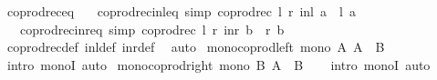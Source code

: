 \begin{isabellebody}
\isanewline
{}\isamarkupfalse%
\ coprod{\isacharunderscore}{\kern0pt}rec{\isacharunderscore}{\kern0pt}eq{\isacharcolon}{\kern0pt}\isanewline
\ \ \ coprod{\isacharunderscore}{\kern0pt}rec{\isacharunderscore}{\kern0pt}inl{\isacharunderscore}{\kern0pt}eq\ {\isacharbrackleft}{\kern0pt}simp{\isacharbrackright}{\kern0pt}{\isacharcolon}{\kern0pt}\ {\isachardoublequoteopen}coprod{\isacharunderscore}{\kern0pt}rec\ l\ r\ {\isacharparenleft}{\kern0pt}inl\ a{\isacharparenright}{\kern0pt}\ {\isacharequal}{\kern0pt}\ l\ a{\isachardoublequoteclose}\isanewline
\ \ \ coprod{\isacharunderscore}{\kern0pt}rec{\isacharunderscore}{\kern0pt}inr{\isacharunderscore}{\kern0pt}eq\ {\isacharbrackleft}{\kern0pt}simp{\isacharbrackright}{\kern0pt}{\isacharcolon}{\kern0pt}\ {\isachardoublequoteopen}coprod{\isacharunderscore}{\kern0pt}rec\ l\ r\ {\isacharparenleft}{\kern0pt}inr\ b{\isacharparenright}{\kern0pt}\ {\isacharequal}{\kern0pt}\ r\ b{\isachardoublequoteclose}\isanewline
%
\isadelimproof
\ \ %
\endisadelimproof
%
\isatagproof
{}\isamarkupfalse%
\ coprod{\isacharunderscore}{\kern0pt}rec{\isacharunderscore}{\kern0pt}def\ inl{\isacharunderscore}{\kern0pt}def\ inr{\isacharunderscore}{\kern0pt}def\ \isamarkupfalse%
\ auto%
\endisatagproof
{\isafoldproof}%
%
\isadelimproof
\isanewline
%
\endisadelimproof
\isanewline
\isanewline
{}\isamarkupfalse%
\ mono{\isacharunderscore}{\kern0pt}coprod{\isacharunderscore}{\kern0pt}left{\isacharcolon}{\kern0pt}\ {\isachardoublequoteopen}mono\ {\isacharparenleft}{\kern0pt}{\isasymlambda}A{\isachardot}{\kern0pt}\ A\ {\isasymCoprod}\ B{\isacharparenright}{\kern0pt}{\isachardoublequoteclose}\isanewline
%
\isadelimproof
\ \ %
\endisadelimproof
%
\isatagproof
{}\isamarkupfalse%
\ {\isacharparenleft}{\kern0pt}intro\ monoI{\isacharparenright}{\kern0pt}\ auto%
\endisatagproof
{\isafoldproof}%
%
\isadelimproof
\isanewline
%
\endisadelimproof
\isanewline
{}\isamarkupfalse%
\ mono{\isacharunderscore}{\kern0pt}coprod{\isacharunderscore}{\kern0pt}right{\isacharcolon}{\kern0pt}\ {\isachardoublequoteopen}mono\ {\isacharparenleft}{\kern0pt}{\isasymlambda}B{\isachardot}{\kern0pt}\ A\ {\isasymCoprod}\ B{\isacharparenright}{\kern0pt}{\isachardoublequoteclose}\isanewline
%
\isadelimproof
\ \ %
\endisadelimproof
%
\isatagproof
{}\isamarkupfalse%
\ {\isacharparenleft}{\kern0pt}intro\ monoI{\isacharparenright}{\kern0pt}\ auto%
\endisatagproof
{\isafoldproof}%
%
\isadelimproof
\isanewline
%
\endisadelimproof
\isanewline
%
\isadelimtheory
\isanewline
%
\endisadelimtheory
%
\isatagtheory
{}\isamarkupfalse%
%
\endisatagtheory
{\isafoldtheory}%
%
\isadelimtheory
%
\endisadelimtheory
%
\end{isabellebody}%

